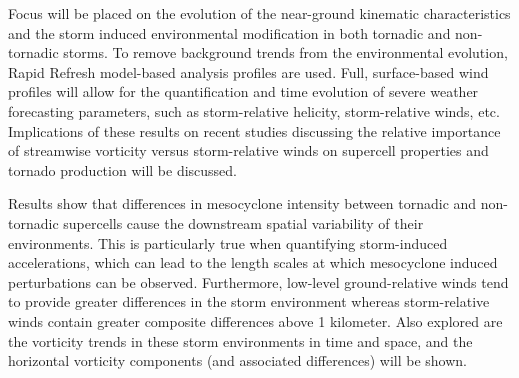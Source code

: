 Focus will be placed on the evolution of the near-ground kinematic characteristics and the storm induced environmental modification in both tornadic and non-tornadic storms. To remove background trends from the environmental evolution, Rapid Refresh model-based analysis profiles are used. Full, surface-based wind profiles will allow for the quantification and time evolution of severe weather forecasting parameters, such as storm-relative helicity, storm-relative winds, etc. Implications of these results on recent studies discussing the relative importance of streamwise vorticity versus storm-relative winds on supercell properties and tornado production will be discussed. 

Results show that differences in mesocyclone intensity between tornadic and non-tornadic supercells cause the downstream spatial variability of their environments. This is particularly true when quantifying storm-induced accelerations, which can lead to the length scales at which mesocyclone induced perturbations can be observed. Furthermore, low-level ground-relative winds tend to provide greater differences in the storm environment whereas storm-relative winds contain greater composite differences above 1 kilometer. Also explored are the vorticity trends in these storm environments in time and space, and the horizontal vorticity components (and associated differences) will be shown. 





